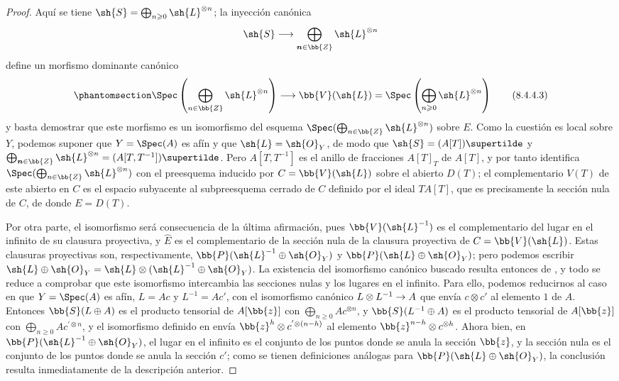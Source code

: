 \documentclass[oneside,10pt]{amsart}
\makeatletter
\renewcommand{\geq}{\geqslant}
\newcommand{\ega@arrow}[2]{\mathchoice{#1}{#2}{#2}{#2}}
\renewcommand{\to}{\ega@arrow{\longrightarrow}{\rightarrow}}
\newcommand{\oldpage}[2][]{\marginnote{\normalfont\footnotesize\textbf{#1}~|~#2}\ignorespaces}
\let\EGAOriginalLabel\label
\renewcommand{\label}[1]{\phantomsection\EGAOriginalLabel{#1}}
\newcommand*{\ega@labelnumber}[1]{\StrBehind{#1}{.}}
\newcommand{\eref}[1]{\hyperref[#1]{\normalfont{(\ega@labelnumber{#1})}}}
\makeatother
\begin{document}
\begin{proof}
Aquí se tiene $\sh{S}=\bigoplus_{n\geq0}\sh{L}^{\otimes n}$;
la inyección canónica
\[
  \sh{S} \to \bigoplus_{\boldsymbol{n}\in\bb{Z}} \sh{L}^{\otimes n}
\]
define un morfismo dominante canónico
\[
\label{eq:2.8.4.4.3}
  \Spec\left(
    \bigoplus_{n\in\bb{Z}} \sh{L}^{\otimes n}
  \right)
  \to
  \bb{V}(\sh{L})
  =
  \Spec\left(
    \bigoplus_{n\geq0} \sh{L}^{\otimes n}
  \right)
\tag{8.4.4.3}
\]
y basta demostrar que este morfismo es un isomorfismo del esquema $\Spec(\bigoplus_{n\in\bb{Z}} \sh{L}^{\otimes n})$ sobre $E$.
Como la cuestión es local sobre $Y$, podemos suponer que $Y=\Spec(A)$ es afín
\oldpage[II]{169}
y que $\sh{L}=\sh{O}_Y$, de modo que $\sh{S}=(A[T])\supertilde$ y $\bigoplus_{\boldsymbol n\in\bb{Z}}\sh{L}^{\otimes n} = (A[T,T^{-1}])\supertilde$.
Pero $A[T,T^{-1}]$ es el anillo de fracciones $A[T]_T$ de $A[T]$, y por tanto \eref{eq:2.8.4.4.3} identifica $\Spec(\bigoplus_{n\in\bb{Z}}\sh{L}^{\otimes n})$ con el preesquema inducido por $C=\bb{V}(\sh{L})$ sobre el abierto $D(T)$;
el complementario $V(T)$ de este abierto en $C$ es el espacio subyacente al subpreesquema cerrado de $C$ definido por el ideal $TA[T]$, que es precisamente la sección nula de $C$, de donde $E=D(T)$.

Por otra parte, el isomorfismo \eref{eq:2.8.4.4.2} será consecuencia de la última afirmación, pues $\bb{V}(\sh{L}^{-1})$ es el complementario del lugar en el infinito de su clausura proyectiva, y $\widehat{E}$ es el complementario de la sección nula de la clausura proyectiva de $C=\bb{V}(\sh{L})$.
Estas clausuras proyectivas son, respectivamente, $\bb{P}(\sh{L}^{-1}\oplus\sh{O}_Y)$ y $\bb{P}(\sh{L}\oplus\sh{O}_Y)$;
pero podemos escribir $\sh{L}\oplus\sh{O}_Y = \sh{L}\otimes(\sh{L}^{-1}\oplus\sh{O}_Y)$.
La existencia del isomorfismo canónico buscado resulta entonces de , y todo se reduce a comprobar que este isomorfismo intercambia las secciones nulas y los lugares en el infinito.
Para ello, podemos reducirnos al caso en que $Y=\Spec(A)$ es afín, $L=Ac$ y $L^{-1}=Ac'$, con el isomorfismo canónico $L\otimes L^{-1}\to A$ que envía $c\otimes c'$ al elemento $1$ de $A$.
Entonces $\bb{S}(L\oplus A)$ es el producto tensorial de $A[\bb{z}]$ con $\bigoplus_{n\geq0}Ac^{\otimes n}$, y $\bb{S}(L^{-1}\oplus A)$ es el producto tensorial de $A[\bb{z}]$ con $\bigoplus_{n\geq0}Ac^{'\otimes n}$, y el isomorfismo definido en  envía $\bb{z}^h\otimes c^{'\otimes(n-h)}$ al elemento $\bb{z}^{n-h}\otimes c^{\otimes h}$.
Ahora bien, en $\bb{P}(\sh{L}^{-1}\oplus\sh{O}_Y)$, el lugar en el infinito es el conjunto de los puntos donde se anula la sección $\bb{z}$, y la sección nula es el conjunto de los puntos donde se anula la sección $c'$;
como se tienen definiciones análogas para $\bb{P}(\sh{L}\oplus\sh{O}_Y)$, la conclusión resulta inmediatamente de la descripción anterior.
\end{proof}
\end{document}
